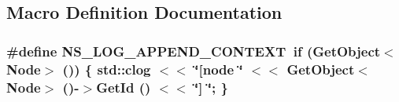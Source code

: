 \subsection{Macro Definition Documentation}
\subsubsection[{\texorpdfstring{N\+S\+\_\+\+L\+O\+G\+\_\+\+A\+P\+P\+E\+N\+D\+\_\+\+C\+O\+N\+T\+E\+XT}{NS_LOG_APPEND_CONTEXT}}]{\setlength{\rightskip}{0pt plus 5cm}\#define N\+S\+\_\+\+L\+O\+G\+\_\+\+A\+P\+P\+E\+N\+D\+\_\+\+C\+O\+N\+T\+E\+XT~{\bf if} (Get\+Object$<$Node$>$ ()) \{ std\+::clog $<$$<$ \char`\"{}\mbox{[}node \char`\"{} $<$$<$ Get\+Object$<$Node$>$ ()-\/$>$Get\+Id () $<$$<$ \char`\"{}\mbox{]} \char`\"{}; \}}\hypertarget{dsr-options_8cc_abe50035652d407c40bdaef78214c4955}{}\label{dsr-options_8cc_abe50035652d407c40bdaef78214c4955}
